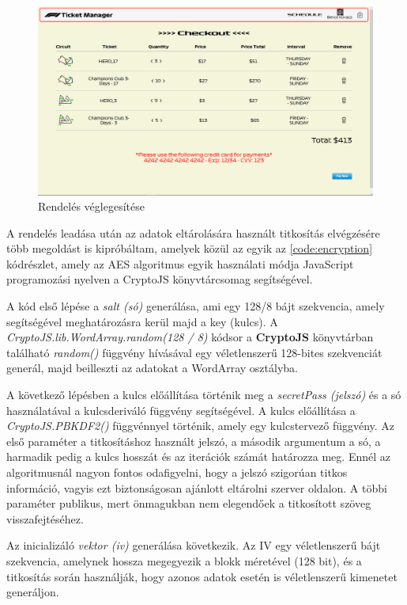 \begin{figure}[!h]
	\centering
	\includegraphics[scale=0.2]{images/checkout}
	\caption{Rendelés véglegesítése}
	\label{abra:checkout}
\end{figure}

A rendelés leadása után az adatok eltárolására használt titkosítás elvégzésére több megoldást is kipróbáltam, amelyek közül az egyik az \ref{code:encryption} kódrészlet, amely az AES algoritmus egyik használati módja JavaScript programozási nyelven a CryptoJS könyvtárcsomag segítségével.

A kód első lépése a \textit{salt (só)} generálása, ami egy 128/8 bájt szekvencia, amely segítségével meghatározásra kerül majd a key (kulcs). A \textit{CryptoJS.lib.WordArray.random(128 / 8)} kódsor a \textbf{CryptoJS} könyvtárban található \textit{random()} függvény hívásával egy véletlenszerű 128-bites szekvenciát generál, majd beilleszti az adatokat a WordArray osztályba.

A következő lépésben a kulcs előállítása történik meg a \textit{secretPass (jelszó)} és a só használatával a kulcsderiváló függvény segítségével. A kulcs előállítása a \textit{CryptoJS.PBKDF2()} függvénnyel történik, amely egy kulcstervező függvény. Az első paraméter a titkosításhoz használt jelszó, a második argumentum a só, a harmadik pedig a kulcs hosszát és az iterációk számát határozza meg. Ennél az algoritmusnál nagyon fontos odafigyelni, hogy a jelszó szigorúan titkos információ, vagyis ezt biztonságosan ajánlott eltárolni szerver oldalon. A többi paraméter publikus, mert önmagukban nem elegendőek a titkosított szöveg visszafejtéséhez.

Az inicializáló \textit{vektor (iv)} generálása következik. Az IV egy véletlenszerű bájt szekvencia, amelynek hossza megegyezik a blokk méretével (128 bit), és a titkosítás során használják, hogy azonos adatok esetén is véletlenszerű kimenetet generáljon.

